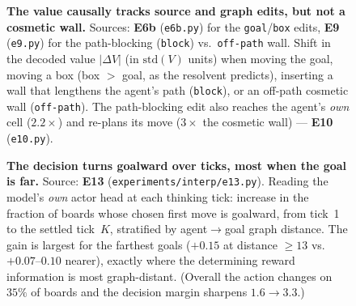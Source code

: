 \documentclass{article} %
\theoremstyle{plain}
\theoremstyle{definition}
\begin{document}
\begin{figure}[t]\centering
{}
\caption{\textbf{The value causally tracks source and graph edits, but not a cosmetic wall.}
Sources: \textbf{E6b} (\texttt{e6b.py}) for the \texttt{goal}/\texttt{box} edits, \textbf{E9}
(\texttt{e9.py}) for the path-blocking (\texttt{block}) vs.\ \texttt{off-path} wall. Shift in the
decoded value $|\Delta V|$ (in $\mathrm{std}(V)$ units) when moving the goal, moving a box (box
$>$ goal, as the resolvent predicts), inserting a wall that lengthens the agent's path
(\texttt{block}), or an off-path cosmetic wall (\texttt{off-path}). The path-blocking edit also
reaches the agent's \emph{own} cell ($2.2\times$) and re-plans its move ($3\times$ the cosmetic
wall) --- \textbf{E10} (\texttt{e10.py}).}
\label{fig:abl}
\end{figure}

\begin{figure}[t]\centering
{}
\caption{\textbf{The decision turns goalward over ticks, most when the goal is far.} Source:
\textbf{E13} (\texttt{experiments/interp/e13.py}). Reading the model's \emph{own} actor head at
each thinking tick: increase in the fraction of boards whose chosen first move is goalward, from
tick~1 to the settled tick~$K$, stratified by agent$\to$goal graph distance. The gain is largest
for the farthest goals ($+0.15$ at distance $\geq13$ vs.\ $+0.07$--$0.10$ nearer), exactly where
the determining reward information is most graph-distant. (Overall the action changes on $35\%$
of boards and the decision margin sharpens $1.6\!\to\!3.3$.)}
\label{fig:decide}
\end{figure}
\end{document}
